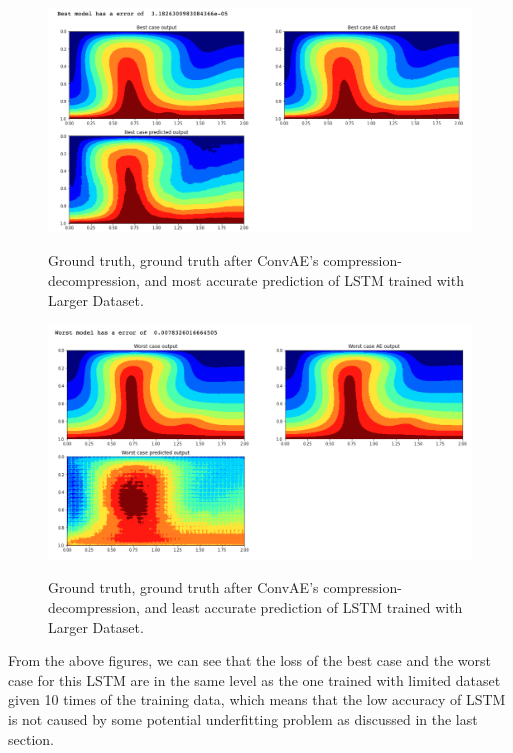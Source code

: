 \begin{figure}[H]
    \caption{Ground truth, ground truth after ConvAE's compression-decompression, and most accurate prediction of LSTM trained with Larger Dataset.}
    \includegraphics[scale=0.5]{figures/mantle_convection_images/larger_dataset/LSTM_Best.png}
    \label{figure:LSTM_larger_best}
\end{figure}

\begin{figure}[H]
    \caption{Ground truth, ground truth after ConvAE's compression-decompression, and least accurate prediction of LSTM trained with Larger Dataset.}
    \includegraphics[scale=0.5]{figures/mantle_convection_images/larger_dataset/LSTM_Worst.png}
    \label{figure:LSTM_larger_worst}
\end{figure}


From the above figures, we can see that the loss of the best case and the worst case for this LSTM are in the same level as the one trained with limited dataset given 10 times of the training data, which means that the low accuracy of LSTM is not caused by some potential underfitting problem as discussed in the last section.

